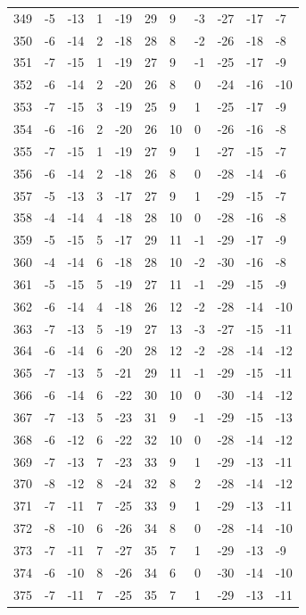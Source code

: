 \begin{table}[H]
\begin{tabular}{lllllllllll}
349 & -5 & -13 & 1 & -19 & 29 & 9 & -3 & -27 & -17 & -7 \\
350 & -6 & -14 & 2 & -18 & 28 & 8 & -2 & -26 & -18 & -8 \\
351 & -7 & -15 & 1 & -19 & 27 & 9 & -1 & -25 & -17 & -9 \\
352 & -6 & -14 & 2 & -20 & 26 & 8 & 0 & -24 & -16 & -10 \\
353 & -7 & -15 & 3 & -19 & 25 & 9 & 1 & -25 & -17 & -9 \\
354 & -6 & -16 & 2 & -20 & 26 & 10 & 0 & -26 & -16 & -8 \\
355 & -7 & -15 & 1 & -19 & 27 & 9 & 1 & -27 & -15 & -7 \\
356 & -6 & -14 & 2 & -18 & 26 & 8 & 0 & -28 & -14 & -6 \\
357 & -5 & -13 & 3 & -17 & 27 & 9 & 1 & -29 & -15 & -7 \\
358 & -4 & -14 & 4 & -18 & 28 & 10 & 0 & -28 & -16 & -8 \\
359 & -5 & -15 & 5 & -17 & 29 & 11 & -1 & -29 & -17 & -9 \\
360 & -4 & -14 & 6 & -18 & 28 & 10 & -2 & -30 & -16 & -8 \\
361 & -5 & -15 & 5 & -19 & 27 & 11 & -1 & -29 & -15 & -9 \\
362 & -6 & -14 & 4 & -18 & 26 & 12 & -2 & -28 & -14 & -10 \\
363 & -7 & -13 & 5 & -19 & 27 & 13 & -3 & -27 & -15 & -11 \\
364 & -6 & -14 & 6 & -20 & 28 & 12 & -2 & -28 & -14 & -12 \\
365 & -7 & -13 & 5 & -21 & 29 & 11 & -1 & -29 & -15 & -11 \\
366 & -6 & -14 & 6 & -22 & 30 & 10 & 0 & -30 & -14 & -12 \\
367 & -7 & -13 & 5 & -23 & 31 & 9 & -1 & -29 & -15 & -13 \\
368 & -6 & -12 & 6 & -22 & 32 & 10 & 0 & -28 & -14 & -12 \\
369 & -7 & -13 & 7 & -23 & 33 & 9 & 1 & -29 & -13 & -11 \\
370 & -8 & -12 & 8 & -24 & 32 & 8 & 2 & -28 & -14 & -12 \\
371 & -7 & -11 & 7 & -25 & 33 & 9 & 1 & -29 & -13 & -11 \\
372 & -8 & -10 & 6 & -26 & 34 & 8 & 0 & -28 & -14 & -10 \\
373 & -7 & -11 & 7 & -27 & 35 & 7 & 1 & -29 & -13 & -9 \\
374 & -6 & -10 & 8 & -26 & 34 & 6 & 0 & -30 & -14 & -10 \\
375 & -7 & -11 & 7 & -25 & 35 & 7 & 1 & -29 & -13 & -11 \\

\end{tabular}
\end{table}
